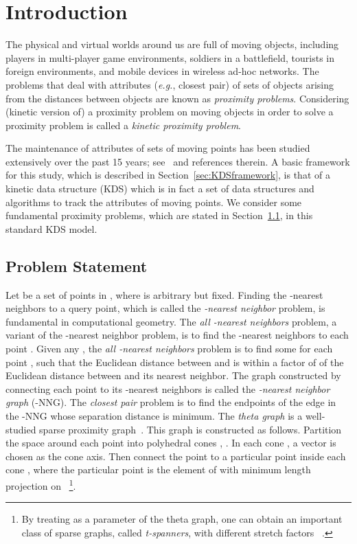 \documentclass[preprint,12pt]{elsarticle}
\def\knng{\mbox{-NNG}}
\newcommand{\eg}{\emph{e.g.}}
\begin{document}
\section{Introduction}
The physical and virtual worlds around us are full of moving objects, including players in multi-player game environments, soldiers in a battlefield, tourists in foreign environments, and mobile devices in wireless ad-hoc networks. The problems that deal with attributes  (\eg, closest pair) of sets of objects arising from the distances between objects are known as \textit{proximity problems}.  Considering (kinetic version of) a proximity problem on moving objects in order to solve a proximity problem is called a \textit{kinetic proximity problem}.

The maintenance of attributes of sets of moving points has been studied extensively over the past 15 years; see~\cite{rahmati2014simple} and references therein. A basic framework for this study, which is described in Section~\ref{sec:KDSframework}, is that of a kinetic data structure (KDS) which is in fact a set of data structures and algorithms to track the attributes of moving points. We consider some  fundamental proximity problems, which are stated in Section~\ref{sec:ProbStatment}, in this standard KDS model.

\subsection{Problem Statement}\label{sec:ProbStatment}
Let  be a set of  points in , where  is arbitrary but fixed. Finding the -nearest neighbors to a query point, which is called the \textit{-nearest neighbor} problem, is fundamental in computational geometry. The \textit{all -nearest neighbors} problem, a variant of the -nearest neighbor problem, is to find the -nearest neighbors to each point . Given any , the \textit{all -nearest neighbors} problem is to find some  for each point , such that the Euclidean distance  between  and  is within a factor of  of the Euclidean distance between  and its nearest neighbor. The graph constructed by connecting each point  to its -nearest neighbors is called the \textit{-nearest neighbor graph} (\knng). The \textit{closest pair} problem is to find the endpoints of the edge in the -NNG whose separation distance is minimum. 
The \textit{theta graph} is a well-studied sparse proximity graph~\cite{Clarkson:1987:AAS:28395.28402,Keil:1988:ACE:61764.61787}. This graph is constructed as follows. Partition the space around each point  into  polyhedral cones , . In each cone , a vector  is chosen as the cone axis. Then connect the point  to a particular point inside each cone , where the particular point is the element of  with minimum length projection on ~\footnote{By treating  as a parameter of the theta graph, one can obtain an important class of sparse graphs, called \textit{t-spanners}, with different stretch factors ~\cite{DBLP:journals/corr/BoseCMRV14}.}.
\end{document}
